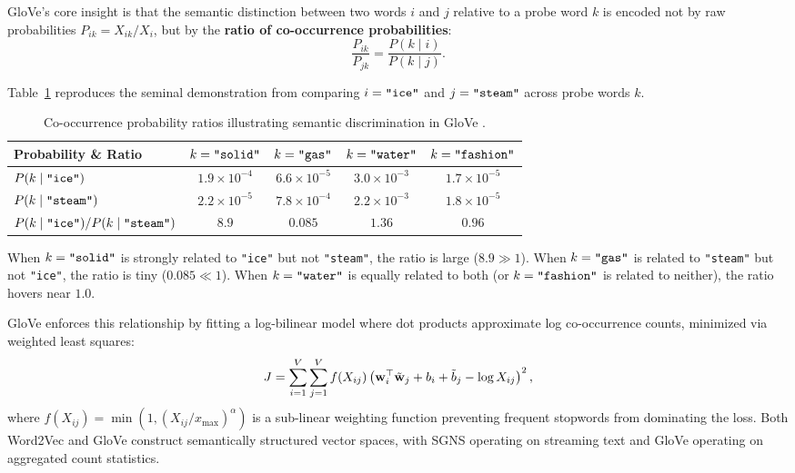 \documentclass[../../../main.tex]{subfiles}
\begin{document}
GloVe's core insight is that the semantic distinction between two words $i$ and $j$ relative to a probe word $k$ is encoded not by raw probabilities $P_{ik} = X_{ik}/X_i$, but by the \textbf{ratio of co-occurrence probabilities}:
\begin{equation}
\label{eq:glove_ratio}
\frac{P_{ik}}{P_{jk}} = \frac{P(k \mid i)}{P(k \mid j)}.
\end{equation}

Table~\ref{tab:glove_ratio} reproduces the seminal demonstration from \cite{pennington2014glove} comparing $i = \text{\texttt{"ice"}}$ and $j = \text{\texttt{"steam"}}$ across probe words $k$.

\begin{table}[htbp]
\centering
\small
\caption{Co-occurrence probability ratios illustrating semantic discrimination in GloVe \cite{pennington2014glove}.}
\label{tab:glove_ratio}
\begin{tabular}{lcccc}
\toprule
\textbf{Probability \& Ratio} & $k = \text{\texttt{"solid"}}$ & $k = \text{\texttt{"gas"}}$ & $k = \text{\texttt{"water"}}$ & $k = \text{\texttt{"fashion"}}$ \\
\midrule
$P(k \mid \text{\texttt{"ice"\/}})$ & $1.9 \times 10^{-4}$ & $6.6 \times 10^{-5}$ & $3.0 \times 10^{-3}$ & $1.7 \times 10^{-5}$ \\
$P(k \mid \text{\texttt{"steam"\/}})$ & $2.2 \times 10^{-5}$ & $7.8 \times 10^{-4}$ & $2.2 \times 10^{-3}$ & $1.8 \times 10^{-5}$ \\
\midrule
$P(k \mid \text{\texttt{"ice"\/}}) / P(k \mid \text{\texttt{"steam"\/}})$ & $\mathbf{8.9}$ & $\mathbf{0.085}$ & $1.36$ & $0.96$ \\
\bottomrule
\end{tabular}
\end{table}

When $k = \text{\texttt{"solid"}}$ is strongly related to \texttt{"ice"} but not \texttt{"steam"}, the ratio is large ($8.9 \gg 1$). When $k = \text{\texttt{"gas"}}$ is related to \texttt{"steam"} but not \texttt{"ice"}, the ratio is tiny ($0.085 \ll 1$). When $k = \text{\texttt{"water"}}$ is equally related to both (or $k = \text{\texttt{"fashion"}}$ is related to neither), the ratio hovers near $1.0$.

GloVe enforces this relationship by fitting a log-bilinear model where dot products approximate log co-occurrence counts, minimized via weighted least squares:
\begin{equation}
\label{eq:glove_loss}
J = \sum_{i=1}^V \sum_{j=1}^V f(X_{ij}) \left( \mathbf{w}_i^\top \tilde{\mathbf{w}}_j + b_i + \tilde{b}_j - \log X_{ij} \right)^2,
\end{equation}
where $f(X_{ij}) = \min(1, (X_{ij}/x_{\max})^\alpha)$ is a sub-linear weighting function preventing frequent stopwords from dominating the loss. Both Word2Vec and GloVe construct semantically structured vector spaces, with SGNS operating on streaming text and GloVe operating on aggregated count statistics.
\end{document}
